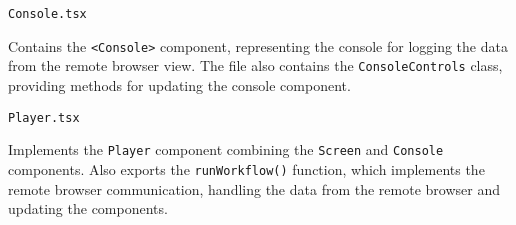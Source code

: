 \emptyline
\verb|Console.tsx|
\smallskip

Contains the \texttt{<Console>} component, representing the console for logging the data from the remote browser view.
The file also contains the \texttt{ConsoleControls} class, providing methods for updating the console component.

\emptyline
\verb|Player.tsx|
\smallskip

Implements the \texttt{Player} component combining the \texttt{Screen} and \texttt{Console} components.
Also exports the \texttt{runWorkflow()} function, which implements the remote browser communication, handling the data from the remote browser and updating the components.
